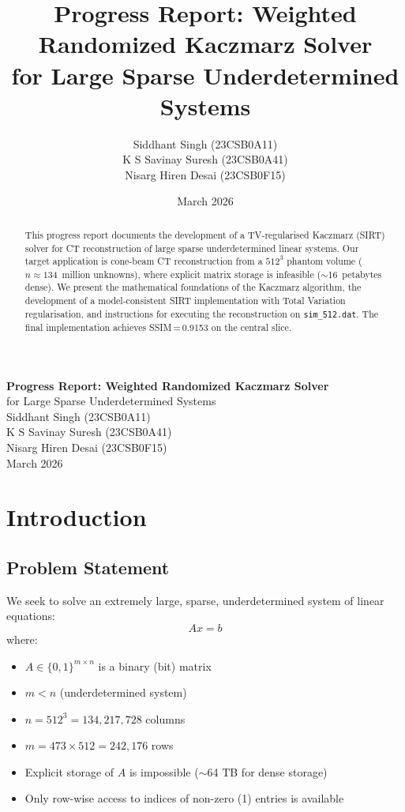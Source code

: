 \documentclass[11pt,a4paper]{article}
\title{%
    \textbf{Progress Report: Weighted Randomized Kaczmarz Solver}\\[0.5em]
    \large for Large Sparse Underdetermined Systems
}
\author{
    Siddhant Singh (23CSB0A11)\\
    K S Savinay Suresh (23CSB0A41)\\
    Nisarg Hiren Desai (23CSB0F15)
}
\date{March 2026}
\begin{document}
\begin{titlepage}
    \centering
    \vspace*{\fill}
    {\LARGE\textbf{Progress Report: Weighted Randomized Kaczmarz Solver}\\[0.5em]}
    {\large for Large Sparse Underdetermined Systems}\\[2em]
    {\large
    Siddhant Singh (23CSB0A11)\\[0.3em]
    K S Savinay Suresh (23CSB0A41)\\[0.3em]
    Nisarg Hiren Desai (23CSB0F15)
    }\\[2em]
    {\large March 2026}
    \vspace*{\fill}
\end{titlepage}

\begin{abstract}
This progress report documents the development of a TV-regularised Kaczmarz (SIRT) solver for CT reconstruction of large sparse underdetermined linear systems. Our target application is cone-beam CT reconstruction from a $512^3$ phantom volume ($n \approx 134$~million unknowns), where explicit matrix storage is infeasible ($\sim$16~petabytes dense). We present the mathematical foundations of the Kaczmarz algorithm, the development of a model-consistent SIRT implementation with Total Variation regularisation, and instructions for executing the reconstruction on \texttt{sim\_512.dat}. The final implementation achieves SSIM\,=\,0.9153 on the central slice.
\end{abstract}

\tableofcontents
\newpage

\section{Introduction}

\subsection{Problem Statement}

We seek to solve an extremely large, sparse, underdetermined system of linear equations:
\begin{equation}
    Ax = b
\end{equation}
where:
\begin{itemize}
    \item $A \in \{0, 1\}^{m \times n}$ is a binary (bit) matrix
    \item $m < n$ (underdetermined system)
    \item $n = 512^3 = 134{,}217{,}728$ columns
    \item $m = 473 \times 512 = 242{,}176$ rows
    \item Explicit storage of $A$ is impossible ($\sim$64 TB for dense storage)
    \item Only row-wise access to indices of non-zero (1) entries is available
\end{itemize}
\end{document}
